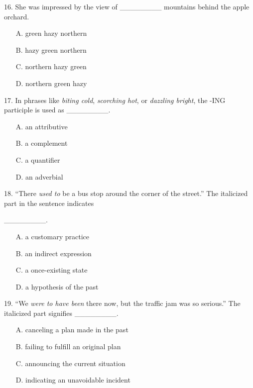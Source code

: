 \documentclass[UTF8,11pt]{ctexart}
\begin{document}
16. She was impressed by the view of \_\_\_\_\_\_\_\_ mountains behind the apple orchard.


\begin{itemize}[leftmargin=2em,itemsep=.2em,topsep=.4em]\item[A.] green hazy northern
\item[B.] hazy green northern
\item[C.] northern hazy green
\item[D.] northern green hazy
\end{itemize}

17. In phrases like \textit{biting cold}, \textit{scorching hot}, or \textit{dazzling bright}, the -ING participle is used as \_\_\_\_\_\_\_\_.


\begin{itemize}[leftmargin=2em,itemsep=.2em,topsep=.4em]\item[A.] an attributive
\item[B.] a complement
\item[C.] a quantifier
\item[D.] an adverbial
\end{itemize}

18. “There \textit{used to} be a bus stop around the corner of the street.” The italicized part in the sentence indicates


\_\_\_\_\_\_\_\_.


\begin{itemize}[leftmargin=2em,itemsep=.2em,topsep=.4em]\item[A.] a customary practice
\item[B.] an indirect expression
\item[C.] a once-existing state
\item[D.] a hypothesis of the past
\end{itemize}

19. “We \textit{were to have been} there now, but the traffic jam was so serious.” The italicized part signifies \_\_\_\_\_\_\_\_.


\begin{itemize}[leftmargin=2em,itemsep=.2em,topsep=.4em]\item[A.] canceling a plan made in the past
\item[B.] failing to fulfill an original plan
\item[C.] announcing the current situation
\item[D.] indicating an unavoidable incident
\end{itemize}
\end{document}
